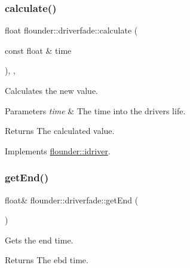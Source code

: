 \subsubsection{\texorpdfstring{calculate()}{calculate()}}
{\footnotesize\ttfamily float flounder\+::driverfade\+::calculate (\begin{DoxyParamCaption}\item[{const float \&}]{time }\end{DoxyParamCaption})\hspace{0.3cm}{\ttfamily [override]}, {\ttfamily [protected]}, {\ttfamily [virtual]}}



Calculates the new value. 


\begin{DoxyParams}{Parameters}
{\em time} & The time into the drivers life. \\
\hline
\end{DoxyParams}
\begin{DoxyReturn}{Returns}
The calculated value. 
\end{DoxyReturn}


Implements \hyperlink{classflounder_1_1idriver_a034c4159dc98c4c37ffdfaae64e4a16d}{flounder\+::idriver}.

\mbox{\label{classflounder_1_1driverfade_a8afc25faac85241befa44a3199d6aa66}} 
\subsubsection{\texorpdfstring{get\+End()}{getEnd()}}
{\footnotesize\ttfamily float\& flounder\+::driverfade\+::get\+End (\begin{DoxyParamCaption}{ }\end{DoxyParamCaption})\hspace{0.3cm}{\ttfamily [inline]}}



Gets the end time. 

\begin{DoxyReturn}{Returns}
The ebd time. 
\end{DoxyReturn}
\mbox{\label{classflounder_1_1driverfade_adc6fe117b31bce8bbeb315f42238c5c7}} 

